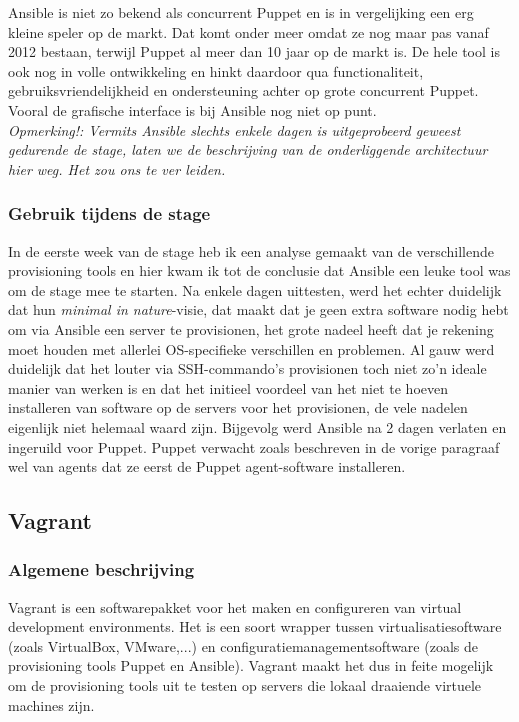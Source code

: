 \documentclass[a4paper,11pt]{article}
\theoremstyle{definition}
\begin{document}
\noindent Ansible is niet zo bekend als concurrent Puppet en is in vergelijking een erg kleine speler op de markt. 
Dat komt onder meer 
omdat ze nog maar pas vanaf 2012 bestaan, terwijl Puppet al meer dan 10 jaar op de 
markt is. De hele tool is ook nog in volle ontwikkeling en hinkt daardoor qua functionaliteit, gebruiksvriendelijkheid en ondersteuning achter op grote concurrent Puppet.
Vooral de grafische interface is bij Ansible nog niet op punt. \\

\noindent \emph{Opmerking!: Vermits Ansible slechts enkele dagen is uitgeprobeerd geweest 
gedurende de stage, laten we de beschrijving van de onderliggende architectuur 
hier weg. Het zou ons te ver leiden.}

\subsubsection{Gebruik tijdens de stage}
In de eerste week van de stage heb ik een analyse gemaakt van de verschillende 
provisioning tools en hier kwam ik tot de conclusie dat Ansible een leuke tool 
was om de stage mee te starten. Na enkele dagen uittesten, werd het echter 
duidelijk dat hun \emph{minimal in nature}-visie, dat maakt dat je geen extra
software nodig hebt om via Ansible een server te provisionen, het grote nadeel heeft dat 
je rekening moet houden met allerlei OS-specifieke verschillen en problemen. Al 
gauw werd duidelijk dat het louter via SSH-commando's provisionen toch niet zo'n 
ideale manier van werken is en dat het initieel voordeel van het niet te hoeven 
installeren van software op de servers voor het provisionen, de vele nadelen eigenlijk niet helemaal 
waard zijn. Bijgevolg werd Ansible na 2 dagen verlaten en ingeruild voor 
Puppet. Puppet verwacht zoals beschreven in de vorige paragraaf wel van agents dat ze eerst de Puppet 
agent-software installeren.

\subsection{Vagrant}
\subsubsection{Algemene beschrijving}
Vagrant is een softwarepakket voor het maken en 
configureren van virtual development environments. Het is een soort wrapper 
tussen virtualisatiesoftware (zoals VirtualBox, VMware,...) en 
configuratiemanagementsoftware (zoals de provisioning tools Puppet en Ansible). Vagrant maakt het 
dus in feite mogelijk om de provisioning tools uit te testen op servers die lokaal draaiende 
virtuele machines zijn. \\
\end{document}
